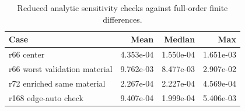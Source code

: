 \begin{table}
\centering
\small
\caption{Reduced analytic sensitivity checks against full-order finite differences.}
\label{tab:sensitivity}
\begin{tabular}{lrrr}
\toprule
Case & Mean & Median & Max \\
\midrule
r66 center & 4.353e-04 & 1.550e-04 & 1.651e-03 \\
r66 worst validation material & 9.762e-03 & 8.477e-03 & 2.907e-02 \\
r72 enriched same material & 2.267e-04 & 2.227e-04 & 4.569e-04 \\
r168 edge-auto check & 9.407e-04 & 1.999e-04 & 5.406e-03 \\
\bottomrule
\end{tabular}
\end{table}

